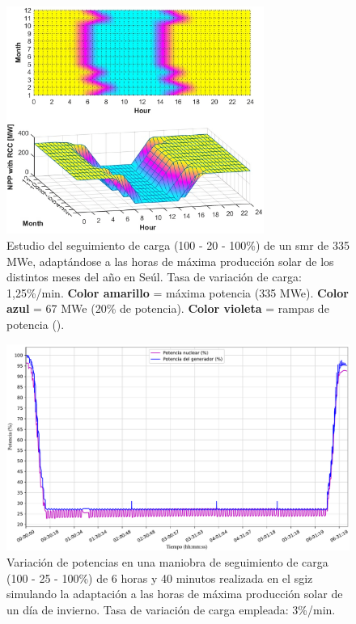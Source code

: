 \begin{enumerate}
    \begin{figure}[h]
      \centering
      \includegraphics[width=0.75\textwidth]{content/figures/seguimiento_carga_smr.png}
      \caption{Estudio del seguimiento de carga (100 - 20 - 100\%) de un \acrshort{smr} de 335 MWe, adaptándose a las horas de máxima producción solar de los distintos meses del año en Seúl. Tasa de variación de carga: 1,25\%/min. \textbf{Color amarillo} = máxima potencia (335 MWe). \textbf{Color azul} = 67 MWe (20\% de potencia). \textbf{Color violeta} = rampas de potencia (\cite{SMRs_load_following_PV}).}
      \label{fig:seguimiento de carga_smr}
    \end{figure} 

    \begin{figure}[h!]
      \centering
      \includegraphics[width=\textwidth]{content/figures/sim2_potencias_arreglo.pdf}
      \vspace{-0.3cm}
      \caption{Variación de potencias en una maniobra de  seguimiento de carga (100 - 25 - 100\%) de 6 horas y 40 minutos realizada en el \acrshort{sgiz} simulando la adaptación a las horas de máxima producción solar de un día de invierno. Tasa de variación de carga empleada: 3\%/min.}
      \label{fig:sim2_potencias}
    \end{figure}
\end{enumerate}

